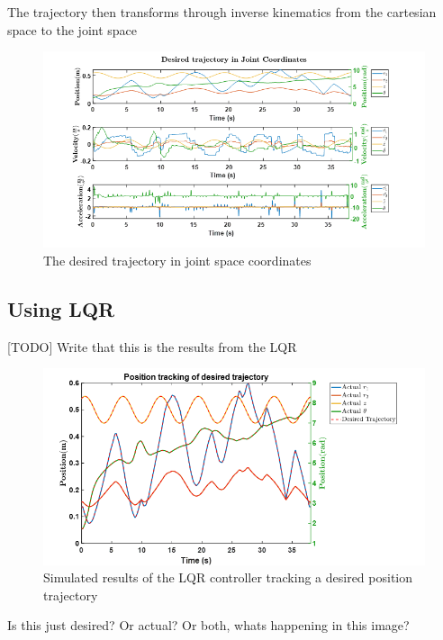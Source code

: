 \documentclass{UoNMCHA}
\numberwithin{equation}{section}
\begin{document}
	The trajectory then transforms through inverse kinematics from the cartesian space to the joint space
	
	\begin{figure}[H]
		\begin{center}
			\includegraphics[width=1\linewidth]{figs/Picture26}
			\caption{The desired trajectory in joint space coordinates}
			\label{figs/Picture26}
		\end{center}
	\end{figure}

\newpage

\subsection{Using LQR}

	[TODO] Write that this is the results from the LQR
	
	\begin{figure}[H]
		\begin{center}
			\includegraphics[width=.8\linewidth]{figs/Picture27}
			\caption{Simulated results of the LQR controller tracking a desired position trajectory}
			\label{figs/Picture27}
		\end{center}
	\end{figure}
	
	
	Is this just desired? Or actual? Or both, whats happening in this image?
	
\end{document}
